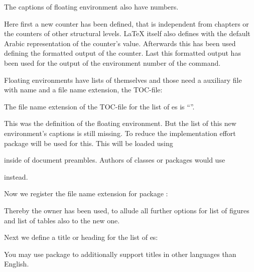 The captions of floating environment also have numbers.
\begin{lstcode}
  \newcommand*{\remarkboxformat}{%
    Remark~\theremarkbox\csname autodot\endcsname}
  \newcommand*{\fnum@remarkbox}{\remarkboxformat}
\end{lstcode}
Here first a new counter has been defined, that is independent from chapters
or the counters of other structural levels. \LaTeX{} itself also defines
 with the default Arabic representation of the counter's
value. Afterwards this has been used defining the formatted output of the
counter. Last this formatted output has been used for the output of the
environment number of the  command.

Floating environments have lists of themselves
and those need a auxiliary file with name  and a file name
extension, the TOC-file:
\begin{lstcode}
  \newcommand*{\ext@remarkbox}{lor}
\end{lstcode}
The file name extension of the TOC-file for the list of
es is ``''.

This was the definition of the floating environment. But the list of this new
environment's captions is still missing. To reduce the implementation effort
package  will be used for this. This will be loaded using
\begin{lstcode}
  \usepackage{tocbasic}
\end{lstcode}
inside of document preambles. Authors of classes or packages would use
\begin{lstcode}
  \RequirePackage{tocbasic}
\end{lstcode}
instead.

Now we register the file name extension for package
:
\begin{lstcode}
\end{lstcode}
Thereby the owner  has been used, to allude all further
\KOMAScript{} options for list of figures and list of tables also to the new
one.

Next we define a title or heading for the list of
es:
\begin{lstcode}
  \newcommand*{\listoflorname}{List of Remarks}
\end{lstcode}
You may use package  to additionally support titles in other
languages than English.

